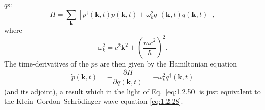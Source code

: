 $q$s:
\begin{equation}
  H=\sum_{\mathbf k}\left[
    p^{\dagger}(\mathbf k,t)p(\mathbf k,t)
    +\omega_k^2q^{\dagger}(\mathbf k,t)q(\mathbf k,t)
  \right],
  \tag{1.2.55}\label{eq:1.2.55}
\end{equation}
where
\begin{equation}
  \omega_k^2=c^2\mathbf k^2+\left(\frac{mc^2}{\hbar}\right)^2.
  \tag{1.2.56}\label{eq:1.2.56}
\end{equation}
The time-derivatives of the $p$s are then given by the Hamiltonian equation
\begin{equation}
  \dot p(\mathbf k,t)=-\frac{\partial H}{\partial q(\mathbf k,t)}
  =-\omega_k^2q^{\dagger}(\mathbf k,t)
  \tag{1.2.57}\label{eq:1.2.57}
\end{equation}
(and its adjoint), a result which in the light of Eq.~\eqref{eq:1.2.50} is just
equivalent to the Klein--Gordon--Schr\"odinger wave equation \eqref{eq:1.2.28}.

